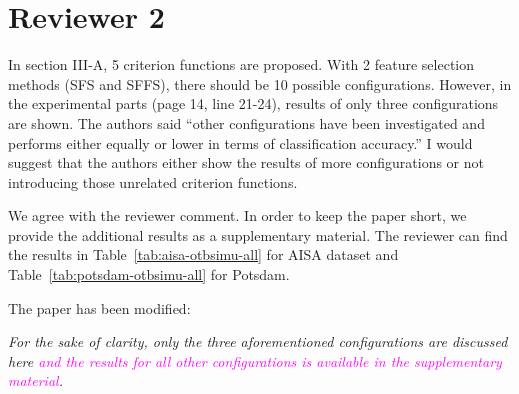 \documentclass[a4paper,10pt,DIV=16]{scrartcl}
\newcommand{\rev}[1]{\textcolor{magenta}{#1}}
\begin{document}
\section{Reviewer 2}
\begin{revbox}
  In section III-A, 5 criterion functions are proposed. With 2 feature selection methods (SFS and SFFS), there should be 10 possible configurations. However, in the experimental parts (page 14, line 21-24), results of only three configurations are shown. The authors said “other configurations have been investigated and performs either equally or lower in terms of classification accuracy.” I would suggest that the authors either show the results of more configurations or not introducing those unrelated criterion functions.
  \begin{resbox}
    We agree with the reviewer comment. In order to keep the paper short, we provide the additional results as a supplementary material. The reviewer can find the results in Table~\ref{tab:aisa-otbsimu-all} for AISA dataset and Table~\ref{tab:potsdam-otbsimu-all} for Potsdam.

    The paper has been modified:

    \emph{For the sake of clarity, only the three aforementioned configurations are discussed here \rev{and the results for all other configurations is available in the supplementary material}.}
  \end{resbox}
\end{revbox}
\end{document}
